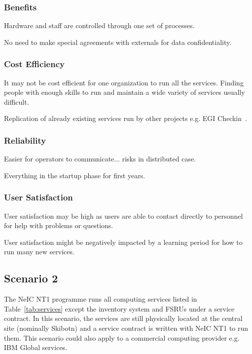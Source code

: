 \documentclass[12pt,a4paper]{article}
\newcommand{\nnt}{NeIC NT1\xspace}
\begin{document}
\subsubsection*{Benefits}
\bitm
\item Hardware and staff are controlled through one set of \EC processes.
\item No need to make special agreements with externals for data confidentiality.
\eitm

\subsubsection*{Cost Efficiency}
\bitm
\item It may not be cost efficient for one organization to run all the services. Finding people with enough skills to run and maintain a wide variety of services usually difficult.
\item Replication of already existing services run by other \einfra projects e.g. EGI Checkin~\cite{egi-checkin}.
\eitm

\subsubsection*{Reliability}
\bitm
\item Easier for operators to communicate... risks in distributed case.
\item Everything in the startup phase for first years.
\eitm

\subsubsection*{User Satisfaction}
\bitm
\item User satisfaction may be high as users are able to contact directly to \EC personnel for help with problems or questions.
\item User satisfaction might be negatively impacted by a learning period for how to run many new services.
\eitm


\subsection{Scenario 2}
\label{ssec:scen2}

The \nnt programme runs all computing services listed in Table~\ref{tab:services} except the \ED inventory system
and FSRUs under a service contract.
In this scenario, the services are still physically located at the central site (nominally Skibotn) and a
service contract is written with \nnt to run them.
This scenario could also apply to a commercial computing provider e.g. IBM Global services.
\end{document}
